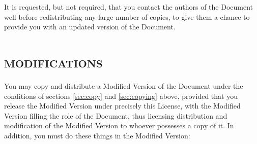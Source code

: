 It is requested, but not required, that you contact the authors of the
Document well before redistributing any large number of copies, to give
them a chance to provide you with an updated version of the Document.


\section[Modifications]{\scshape modifications}\label{sec:mods}

You may copy and distribute a Modified Version of the Document under the
conditions of sections \ref{sec:copy} and \ref{sec:copying} above, provided
that you release the Modified Version under precisely this License, with
the Modified Version filling the role of the Document, thus licensing
distribution and modification of the Modified Version to whoever possesses
a copy of it. In addition, you must do these things in the Modified
Version:

